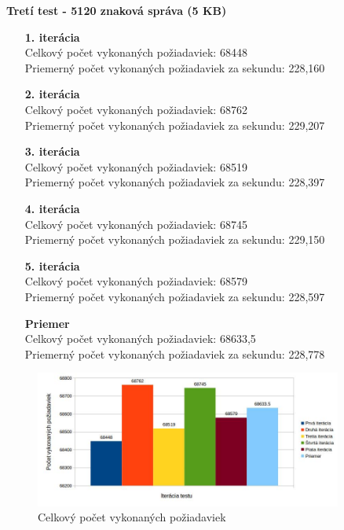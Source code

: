 \documentclass[12pt,oneside,final]{fithesis-utf8}
\begin{document}
\begin{itemize}
\textbf{Tretí test - 5120 znaková správa (5 KB)}
\begin{itemize}

\item[\textbf{1. iterácia}]\ \\
Celkový počet vykonaných požiadaviek: 68448\\
Priemerný počet vykonaných požiadaviek za sekundu: 228,160

\item[\textbf{2. iterácia}]\ \\
Celkový počet vykonaných požiadaviek: 68762\\
Priemerný počet vykonaných požiadaviek za sekundu: 229,207

\item[\textbf{3. iterácia}]\ \\
Celkový počet vykonaných požiadaviek: 68519\\
Priemerný počet vykonaných požiadaviek za sekundu: 228,397

\item[\textbf{4. iterácia}]\ \\
Celkový počet vykonaných požiadaviek: 68745\\
Priemerný počet vykonaných požiadaviek za sekundu: 229,150

\item[\textbf{5. iterácia}]\ \\
Celkový počet vykonaných požiadaviek: 68579\\
Priemerný počet vykonaných požiadaviek za sekundu: 228,597

\item[\textbf{Priemer}]\ \\
Celkový počet vykonaných požiadaviek: 68633,5\\
Priemerný počet vykonaných požiadaviek za sekundu: 228,778

\end{itemize}

\begin{figure}[H]
  \centering
      \includegraphics[width=0.9\textwidth]{gatling3_3.jpg}
  \caption{Celkový počet vykonaných požiadaviek}
\end{figure}


\end{itemize}
\end{document}
